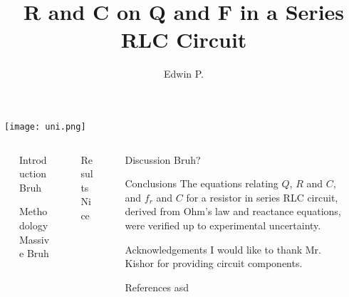 \documentclass[final]{beamer}
\title{R and C on Q and F in a Series RLC Circuit}
\author{Edwin P.}
\newlength{\sepwidth}
\newlength{\colwidth}
\newcommand{\separatorcolumn}{\begin{column}{\sepwidth}\end{column}}
\begin{document}
\logoright
{
\texttt{[image: uni.png]}
}

\begin{frame}[t]
\begin{columns}[t]
  \separatorcolumn
  \begin{column}{\colwidth}

    \begin{block}{Introduction}
      Bruh
    \end{block}
    \begin{block}{Methodology}
      Massive Bruh
    \end{block}

  \end{column}

  \separatorcolumn
  \begin{column}{\colwidth}
    \begin{block}{Results}
      Nice
    \end{block}
  \end{column}

  \separatorcolumn
  \begin{column}{\colwidth}

    \begin{block}{Discussion}
      Bruh?
      

    \end{block}

    \begin{block}{Conclusions}
      The equations relating $Q$, $R$ and $C$, and $f_r$ and $C$ for a resistor in series RLC circuit, derived from Ohm's law and reactance equations, were verified up to experimental uncertainty.
    \end{block}

    \begin{block}{Acknowledgements}
      I would like to thank Mr. Kishor for providing circuit components.
    \end{block}
    
    \begin{block}{References}
      asd
    \end{block}
  \end{column}

  \separatorcolumn
\end{columns}
\end{frame}
\end{document}
